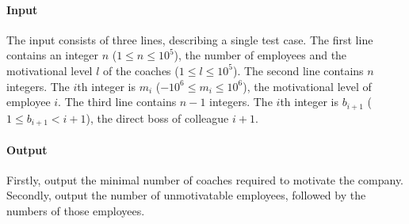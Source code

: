 \paragraph*{Input}

The input consists of three lines, describing a single test case.
The first line contains an integer $n$ ($1 \leq n \leq 10^5$), the number of employees and the motivational level $l$ of the coaches ($1 \leq l \leq 10^5$).
The second line contains $n$ integers. The $i$th integer is $m_i$ ($-10^6 \leq m_i \leq 10^6$), the motivational level of employee $i$.
The third line contains $n - 1$ integers. The $i$th integer is $b_{i+1}$ ($1 \leq b_{i+1} < i + 1$), the direct boss of colleague $i + 1$.

\paragraph*{Output}

Firstly, output the minimal number of coaches required to motivate the company.
Secondly, output the number of unmotivatable employees, followed by the numbers of those employees.


\begin{samples}
\end{samples}


